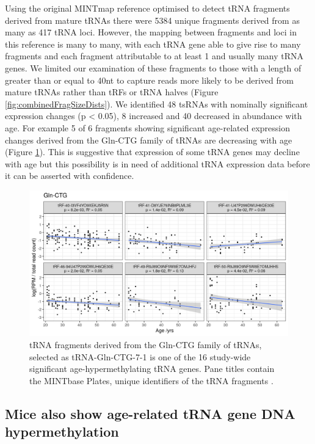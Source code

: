 \documentclass[]{book}
\begin{document}
Using the original MINTmap reference optimised to detect tRNA fragments derived from mature tRNAs there were 5384 unique fragments derived from as many as 417 tRNA loci.
However, the mapping between fragments and loci in this reference is many to many, with each tRNA gene able to give rise to many fragments and each fragment attributable to at least 1 and usually many tRNA genes.
We limited our examination of these fragments to those with a length of greater than or equal to 40nt to capture reads more likely to be derived from mature tRNAs rather than tRFs or tRNA halves (Figure \ref{fig:combinedFragSizeDists}).
We identified 48 tsRNAs with nominally significant expression changes (p \textless{} 0.05), 8 increased and 40 decreased in abundance with age.
For example 5 of 6 fragments showing significant age-related expression changes derived from the Gln-CTG family of tRNAs are decreasing with age (Figure \ref{fig:mintmapres}).
This is suggestive that expression of some tRNA genes may decline with age but this possibility is in need of additional tRNA expression data before it can be asserted with confidence.

\begin{figure}

{\centering \includegraphics[width=1\linewidth]{./figs/nonSigIsoMapbbswsPlotsGln-CTG} 

}

\caption{tRNA fragments derived from the Gln-CTG family of tRNAs, selected as tRNA-Gln-CTG-7-1 is one of the 16 study-wide significant age-hypermethylating tRNA genes. Pane titles contain the MINTbase Plates, unique identifiers of the tRNA fragments \citep{Pliatsika2018}.}\label{fig:mintmapres}
\end{figure}



\hypertarget{mice-also-show-age-related-trna-gene-dna-hypermethylation}{%
\subsection{Mice also show age-related tRNA gene DNA hypermethylation}\label{mice-also-show-age-related-trna-gene-dna-hypermethylation}}
\end{document}
